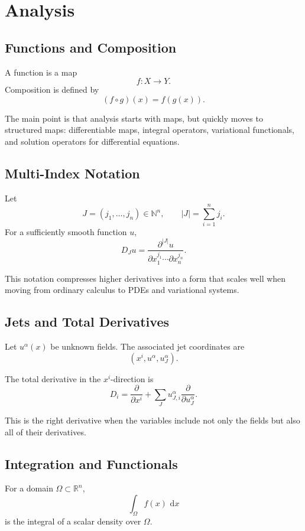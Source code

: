 \documentclass[11pt]{article}
\newcommand{\R}{\mathbb{R}}
\newcommand{\N}{\mathbb{N}}
\newcommand{\dd}{\,\mathrm{d}}
\begin{document}
\section{Analysis}

\subsection{Functions and Composition}

A function is a map
\[
  f : X \to Y.
\]
Composition is defined by
\[
  (f \circ g)(x) = f(g(x)).
\]

The main point is that analysis starts with maps, but quickly moves to
structured maps: differentiable maps, integral operators, variational
functionals, and solution operators for differential equations.

\subsection{Multi-Index Notation}

Let
\[
  J = (j_1,\dots,j_n) \in \N^n,
  \qquad
  |J| = \sum_{i=1}^n j_i.
\]
For a sufficiently smooth function \(u\),
\[
  D_J u =
  \frac{\partial^{|J|} u}
  {\partial x_1^{j_1} \cdots \partial x_n^{j_n}}.
\]

This notation compresses higher derivatives into a form that scales well when
moving from ordinary calculus to PDEs and variational systems.

\subsection{Jets and Total Derivatives}

Let \(u^\alpha(x)\) be unknown fields. The associated jet coordinates are
\[
  (x^i, u^\alpha, u^\alpha_J).
\]

The total derivative in the \(x^i\)-direction is
\[
  D_i
  =
  \frac{\partial}{\partial x^i}
  +
  \sum_J
  u^\alpha_{J,i}
  \frac{\partial}{\partial u^\alpha_J}.
\]

This is the right derivative when the variables include not only the fields but
also all of their derivatives.

\subsection{Integration and Functionals}

For a domain \(\Omega \subset \R^n\),
\[
  \int_\Omega f(x)\,\dd x
\]
is the integral of a scalar density over \(\Omega\).
\end{document}
